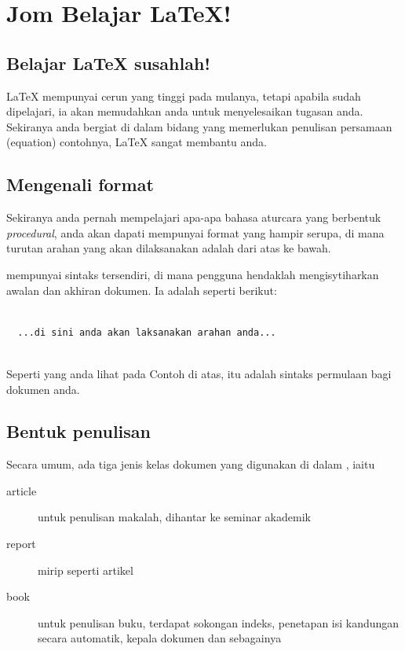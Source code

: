 \chapter{Jom Belajar \LaTeX{}!}
\section{Belajar \LaTeX{} susahlah!}
\label{chap1}
\LaTeX{} mempunyai cerun  yang tinggi pada mulanya, tetapi apabila sudah dipelajari, ia akan memudahkan anda untuk menyelesaikan tugasan anda.
Sekiranya anda bergiat di dalam bidang yang memerlukan penulisan persamaan (equation) contohnya, \LaTeX{} sangat membantu anda.

\section{Mengenali format \latex}
\label{kenal}
Sekiranya anda pernah mempelajari apa-apa bahasa aturcara yang berbentuk \emph{procedural}, anda akan dapati \latex mempunyai format yang hampir serupa, di mana
turutan arahan yang akan dilaksanakan adalah dari atas ke bawah. 

\latex{} mempunyai sintaks tersendiri, di mana pengguna hendaklah mengisytiharkan awalan dan akhiran dokumen. Ia adalah seperti berikut:\\


\begin{minipage}{\textwidth}
\begin{lstlisting}[frame=shadowbox,label={cth1-arahan}]
 
  ...di sini anda akan laksanakan arahan anda...
 
\end{lstlisting}

\end{minipage}


\hspace{2cm}
Seperti yang anda lihat pada Contoh di atas, itu adalah sintaks permulaan bagi dokumen \latex{} anda.

\section{Bentuk penulisan}
Secara umum, ada tiga jenis kelas dokumen yang digunakan di dalam \latex{}, iaitu 

\begin{description}
 \item[article] untuk penulisan makalah, dihantar ke seminar akademik
\item[report] mirip seperti artikel
\item[book]untuk penulisan buku, terdapat sokongan indeks, penetapan isi kandungan secara automatik, kepala dokumen dan sebagainya
\end{description}


